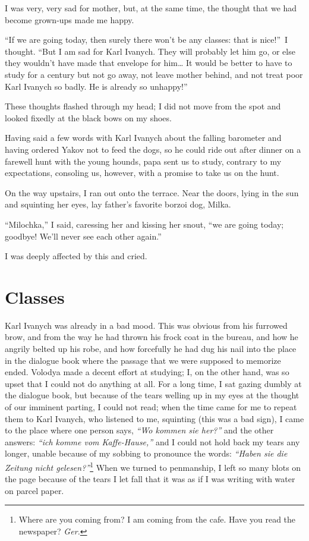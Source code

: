 I was very, very sad for mother, but, at the same time, the thought that we had become grown-ups made me happy.

``If we are going today, then surely there won't be any classes: that is nice!''~I thought. ``But I am sad for Karl Ivanych. They will probably let him go, or else they wouldn't have made that envelope for him\ldots{} It would be better to have to study for a century but not go away, not leave mother behind, and not treat poor Karl Ivanych so badly. He is already so unhappy!'' %

These thoughts flashed through my head; I did not move from the spot and looked fixedly at the black bows on my shoes.

Having said a few words with Karl Ivanych about the falling barometer and having ordered Yakov not to feed the dogs, so he could ride out after dinner on a farewell hunt with the young hounds, papa sent us to study, contrary to my expectations, consoling us, however, with a promise to take us on the hunt.

On the way upstairs, I ran out onto the terrace. Near the doors, lying in the sun and squinting her eyes, lay father's favorite borzoi dog, Milka.

``Milochka,'' I said, caressing her and kissing her snout, ``we are going today; goodbye! We'll never see each other again.'' %

I was deeply affected by this and cried.

\chapter{Classes} %

Karl Ivanych was already in a bad mood. This was obvious from his furrowed brow, and from the way he had thrown his frock coat in the bureau, and how he angrily belted up his robe, and how forcefully he had dug his nail into the place in the dialogue book where the passage that we were supposed to memorize ended. Volodya made a decent effort at studying; I, on the other hand, was so upset that I could not do anything at all. For a long time, I sat gazing dumbly at the dialogue book, but because of the tears welling up in my eyes at the thought of our imminent parting, I could not read; when the time came for me to repeat them to Karl Ivanych, who listened to me, squinting (this was a bad sign), I came to the place where one person says, \textit{``Wo kommen sie her?''} and the other answers: \textit{``ich komme vom Kaffe-Hause,''} and I could not hold back my tears any longer, unable because of my sobbing to pronounce the words: \textit{``Haben sie die Zeitung nicht gelesen?''}\footnote{Where are you coming from? I am coming from the cafe. Have you read the newspaper? \textit{Ger.}} When we turned to penmanship, I left so many blots on the page because of the tears I let fall that it was as if I was writing with water on parcel paper.

